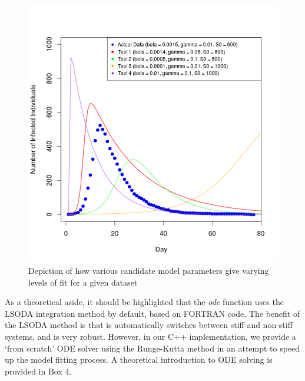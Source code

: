 \documentclass[11pt, a4paper, oneside,titlepage]{article}
\begin{document}
\begin{center}
\begin{figure}[ht!]

\includegraphics[width=15cm]{Rplot01.png}
\caption{Depiction of how various candidate model parameters give
  varying levels of fit for a given dataset}
\end{figure}  
\end{center}

As a theoretical aside, it should be highlighted that the
\emph{ode} function uses the LSODA integration method by default,
based on FORTRAN code. The benefit of the LSODA method is that is
automatically switches between stiff and non-stiff systems, and is
very robust. However, in our C++ implementation, we provide a `from
scratch' ODE solver using the Runge-Kutta method in an attempt to
speed up the model fitting process. A theoretical introduction to ODE
solving is provided in Box 4.  
\end{document}
